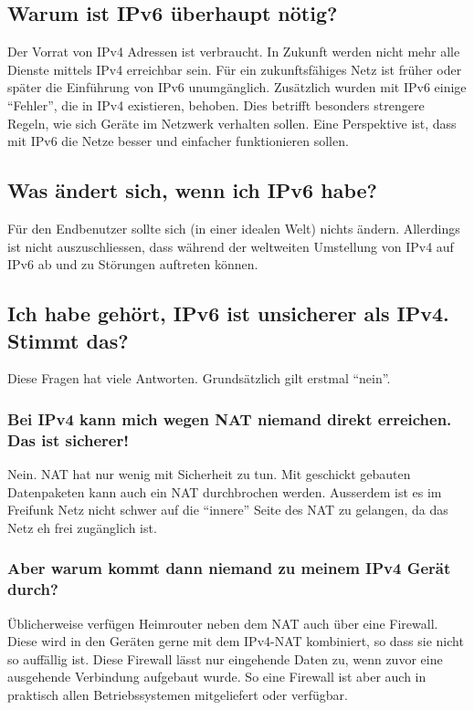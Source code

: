 \documentclass[10pt,a4paper,oneside]{scrartcl}
\begin{document}
\subsection*{Warum ist IPv6 überhaupt nötig?}
Der Vorrat von IPv4 Adressen ist verbraucht. In Zukunft werden nicht mehr alle Dienste mittels IPv4 erreichbar sein.
Für ein zukunftsfähiges Netz ist früher oder später die Einführung von IPv6 unumgänglich.
Zusätzlich wurden mit IPv6 einige ``Fehler'', die in IPv4 existieren, behoben.
Dies betrifft besonders strengere Regeln, wie sich Geräte im Netzwerk verhalten sollen.
Eine Perspektive ist, dass mit IPv6 die Netze besser und einfacher funktionieren sollen.

\subsection*{Was ändert sich, wenn ich IPv6 habe?}
Für den Endbenutzer sollte sich (in einer idealen Welt) nichts ändern.
Allerdings ist nicht auszuschliessen, dass während der weltweiten Umstellung von
IPv4 auf IPv6 ab und zu Störungen auftreten können.

\subsection*{Ich habe gehört, IPv6 ist unsicherer als IPv4. Stimmt das?}
Diese Fragen hat viele Antworten. Grundsätzlich gilt erstmal ``nein''.

\subsubsection*{Bei IPv4 kann mich wegen NAT niemand direkt erreichen. Das ist sicherer!}
Nein. NAT hat nur wenig mit Sicherheit zu tun. Mit geschickt gebauten Datenpaketen kann auch
ein NAT durchbrochen werden.
Ausserdem ist es im Freifunk Netz nicht schwer auf die ``innere'' Seite des NAT zu gelangen,
da das Netz eh frei zugänglich ist.

\subsubsection*{Aber warum kommt dann niemand zu meinem IPv4 Gerät durch?}
Üblicherweise verfügen Heimrouter neben dem NAT auch über eine Firewall.
Diese wird in den Geräten gerne mit dem IPv4-NAT kombiniert,
so dass sie nicht so auffällig ist. Diese Firewall lässt nur eingehende Daten zu,
wenn zuvor eine ausgehende Verbindung aufgebaut wurde.
So eine Firewall ist aber auch in praktisch allen Betriebssystemen mitgeliefert
oder verfügbar.
\end{document}
